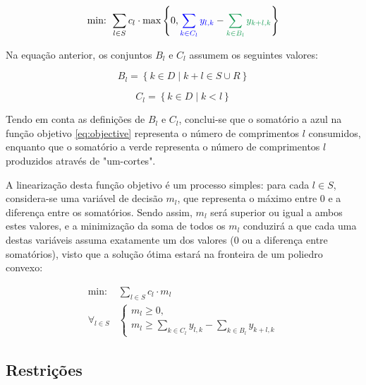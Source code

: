 \documentclass[12pt, a4paper, titlepage]{article}
\begin{document}
\begin{equation}
    \text{min: } \sum_{l \in S} c_l \cdot \max \left \{ 0,
        {\color{blue} \sum_{k \in C_l} y_{l,k}} -
        {\color{ForestGreen} \sum_{k \in B_l} y_{k + l, k}}
    \right \}
    \label{eq:objective}
\end{equation}

Na equação anterior, os conjuntos $B_l$ e $C_l$ assumem os seguintes valores:

\begin{equation}
    B_l = \left \{k \in D \mid k + l \in S \cup R \right \} \label{eq:Bl} \nonumber
\end{equation}

\begin{equation}
    C_l = \left \{k \in D \mid k < l \right \} \label{eq:Cl} \nonumber
\end{equation}

Tendo em conta as definições de $B_l$ e $C_l$, conclui-se que o somatório a {\color{blue} azul}
na função objetivo \eqref{eq:objective} representa o número de comprimentos $l$ consumidos, enquanto
que o somatório a {\color{ForestGreen} verde} representa o número de comprimentos $l$ produzidos
através de "um-cortes"{}.

A linearização desta função objetivo é um processo simples: para cada $l \in S$, considera-se uma
variável de decisão $m_l$, que representa o máximo entre $0$ e a diferença entre os somatórios.
Sendo assim, $m_l$ será superior ou igual a ambos estes valores, e a minimização da soma de todos os
$m_l$ conduzirá a que cada uma destas variáveis assuma exatamente um dos valores ($0$ ou a diferença
entre somatórios), visto que a solução ótima estará na fronteira de um poliedro convexo:

\begin{equation}
    \begin{split}
        \text{min: }      & \sum_{l \in S} c_l \cdot m_l \\
        \forall_{l \in S} & \begin{cases}
            m_l \geq 0, \\
            m_l \geq \sum_{k \in C_l} y_{l,k} - \sum_{k \in B_l} y_{k + l, k}
        \end{cases}
    \end{split}
    \label{eq:objective-expanded}
\end{equation}

\subsection{Restrições}
\end{document}
